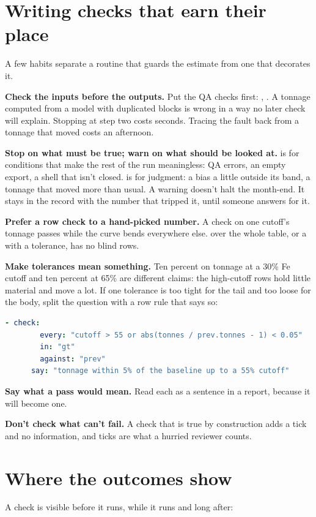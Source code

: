 \section{Writing checks that earn their place}\label{sec:checks-practice}
A few habits separate a routine that guards the estimate from one that decorates it.

\textbf{Check the inputs before the outputs.} Put the QA checks first: , . A tonnage computed from a model with duplicated blocks is wrong in a way no later check will explain. Stopping at step two costs seconds. Tracing the fault back from a tonnage that moved costs an afternoon.

\textbf{Stop on what must be true; warn on what should be looked at.}  is for conditions that make the rest of the run meaningless: QA errors, an empty export, a shell that isn't closed.  is for judgment: a bias a little outside its band, a tonnage that moved more than usual. A warning doesn't halt the month-end. It stays in the record with the number that tripped it, until someone answers for it.

\textbf{Prefer a row check to a hand-picked number.} A check on one cutoff's tonnage passes while the curve bends everywhere else.  over the whole table, or a  with a tolerance, has no blind rows.

\textbf{Make tolerances mean something.} Ten percent on tonnage at a 30\% Fe cutoff and ten percent at 65\% are different claims: the high-cutoff rows hold little material and move a lot. If one tolerance is too tight for the tail and too loose for the body, split the question with a row rule that says so:

\begin{lstlisting}[language=yaml]
    - check:
        every: "cutoff > 55 or abs(tonnes / prev.tonnes - 1) < 0.05"
        in: "gt"
        against: "prev"
      say: "tonnage within 5% of the baseline up to a 55% cutoff"
\end{lstlisting}

\textbf{Say what a pass would mean.} Read each  as a sentence in a report, because it will become one.

\textbf{Don't check what can't fail.} A check that is true by construction adds a tick and no information, and ticks are what a hurried reviewer counts.

\section{Where the outcomes show}\label{sec:checks-where}
A check is visible before it runs, while it runs and long after:

